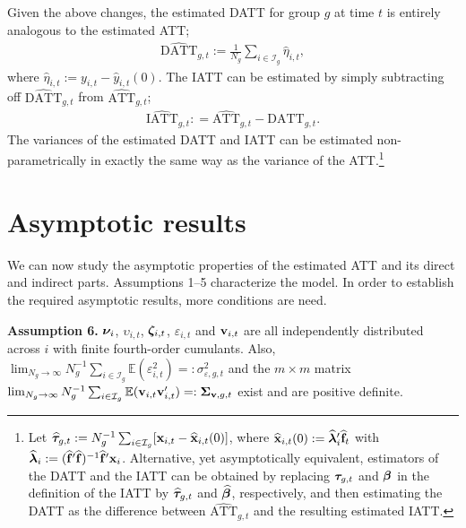 \documentclass[12pt,fleqn]{article}
\begin{document}
  Given the above changes, the estimated DATT for group $g$ at time $t$ is entirely analogous to the estimated ATT;
  \begin{align}
  \widehat{\mathrm{DATT}}_{g,t} := \frac{1}{N_g}\sum_{i \in \mathcal{I}_g} \widehat \eta_{i,t},
  \end{align}
  where $\widehat \eta_{i,t} := y_{i,t} - \widehat y_{i,t}(0)$. The IATT can be estimated by simply subtracting off $\widehat{\mathrm{DATT}}_{g,t}$ from $\widehat{\mathrm{ATT}}_{g,t}$;
  \begin{align}
  \widehat{\mathrm{IATT}}_{g,t} : = \widehat{\mathrm{ATT}}_{g,t} - \widehat{\mathrm{DATT}}_{g,t} .
  \end{align}
  The variances of the estimated DATT and IATT can be estimated non-parametrically in exactly the same way as the variance of the ATT.\footnote{Let
  $\widehat{\boldsymbol{\tau}}_{g,t} := N_g^{-1} \sum_{i \in \mathcal{I}_g} [\mathbf{x}_{i,t} - \widehat{\mathbf{x}}_{i,t}(0)]$, where $\widehat{\mathbf{x}}_{i,t}(0) : = \widehat{\boldsymbol{\lambda}}_i'\widehat{\mathbf{f}}_t$ with $\widehat{\boldsymbol{\lambda}}_i := ( \widehat{\mathbf{f}}' \widehat{\mathbf{f}} )^{-1} \widehat{\mathbf{f}}' \mathbf{x}_i$. Alternative, yet asymptotically equivalent, estimators of the DATT and the IATT can be obtained by replacing $\boldsymbol{\tau}_{g,t}$ and $\boldsymbol{\beta}$ in the definition of the IATT by $\widehat{\boldsymbol{\tau}}_{g,t}$ and $\widehat{\boldsymbol{\beta}}$, respectively, and then estimating the DATT as the difference between $\widehat{\mathrm{ATT}}_{g,t}$ and the resulting estimated IATT.}
  
  \section{Asymptotic results}
  
  We can now study the asymptotic properties of the estimated ATT and its direct and indirect parts. Assumptions 1--5 characterize the model. In order to establish the required asymptotic results, more conditions are need.
  
  \bigskip
  
  \noindent \textbf{Assumption 6.} $\boldsymbol{\nu}_i$, $\upsilon_{i,t}$, $\boldsymbol{\zeta}_{i,t}$, $\varepsilon_{i,t}$ and $\mathbf{v}_{i,t}$ are all independently distributed across $i$ with finite fourth-order cumulants. Also, $\lim_{N_g\to\infty}N_g^{-1}\sum_{i\in \mathcal{I}_g} \mathbb{E}  (\varepsilon_{i,t}^{2}) = : \sigma^2_{\varepsilon,g,t}$ and the $m \times m$ matrix $\lim_{N_g\to\infty}N_g^{-1}\sum_{i\in \mathcal{I}_g}\mathbb{E}  (\mathbf{v}_{i,t}\mathbf{v}_{i,t}') =: \boldsymbol{\Sigma}_{\mathbf{v},g,t}$ exist and are positive definite.
  
\end{document}
